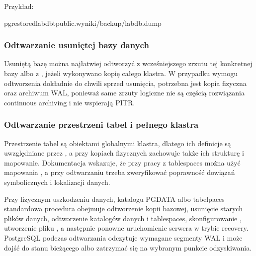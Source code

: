 \documentclass[a4paper,11pt,english,openany,oneside]{sphinxmanual}
\begin{document}
\sphinxAtStartPar
Przykład:

\begin{sphinxVerbatim}[commandchars=\\\{\}]
pg\PYGZus{}restore\PYGZhy{}dlabdb\PYGZhy{}tpublic.wyniki/backup/labdb.dump
\end{sphinxVerbatim}


\subsubsection{Odtwarzanie usuniętej bazy danych}
\label{\detokenize{rozdzial_2/rozdzial_28/index:odtwarzanie-usunietej-bazy-danych}}
\sphinxAtStartPar
Usuniętą bazę można najłatwiej odtworzyć z wcześniejszego zrzutu  tej konkretnej bazy albo z , jeżeli wykonywano kopię całego klastra. W przypadku wymogu odtworzenia dokładnie do chwili sprzed usunięcia, potrzebna jest kopia fizyczna oraz archiwum WAL, ponieważ same zrzuty logiczne nie są częścią rozwiązania continuous archiving i nie wspierają PITR.


\subsubsection{Odtwarzanie przestrzeni tabel i pełnego klastra}
\label{\detokenize{rozdzial_2/rozdzial_28/index:odtwarzanie-przestrzeni-tabel-i-pelnego-klastra}}
\sphinxAtStartPar
Przestrzenie tabel są obiektami globalnymi klastra, dlatego ich definicje są uwzględniane przez , a przy kopiach fizycznych  zachowuje także ich strukturę i mapowanie. Dokumentacja  wskazuje, że przy pracy z tablespaces można użyć mapowania , a przy odtwarzaniu trzeba zweryfikować poprawność dowiązań symbolicznych i lokalizacji danych.

\sphinxAtStartPar
Przy fizycznym uszkodzeniu danych, katalogu PGDATA albo tabelpaces standardowa procedura obejmuje odtworzenie kopii bazowej, usunięcie starych plików danych, odtworzenie katalogów danych i tablespaces, skonfigurowanie , utworzenie pliku , a następnie ponowne uruchomienie serwera w trybie recovery. PostgreSQL podczas odtwarzania odczytuje wymagane segmenty WAL i może dojść do stanu bieżącego albo zatrzymać się na wybranym punkcie odzyskiwania.
\end{document}
